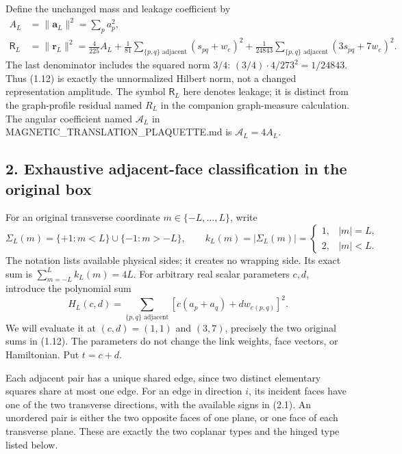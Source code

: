 \documentclass[
  11pt,
]{article}
\begin{document}
Define the unchanged mass and leakage coefficient by \[
\begin{split}
 A_L&=\|\mathbf a_L\|^2=\sum_pa_p^2,\\
 \mathsf R_L&=\|\mathbf r_L\|^2
 =\frac4{225}A_L
  +\frac1{81}\sum_{\{p,q\}\text{ adjacent}}(s_{pq}+w_e)^2
  +\frac1{24843}\sum_{\{p,q\}\text{ adjacent}}(3s_{pq}+7w_e)^2.
\end{split}
\tag{1.12}
\] The last denominator includes the squared norm \(3/4\):
\((3/4)\cdot4/273^2=1/24843\). Thus (1.12) is exactly the unnormalized
Hilbert norm, not a changed representation amplitude. The symbol
\(\mathsf R_L\) here denotes leakage; it is distinct from the
graph-profile residual named \(R_L\) in the companion graph-measure
calculation. The angular coefficient named \(\mathcal A_L\) in
MAGNETIC\_TRANSLATION\_PLAQUETTE.md is \(\mathcal A_L=4A_L\).

\subsection{2. Exhaustive adjacent-face classification in the original
box}\label{magnetic-part-11-exhaustive-adjacent-face-classification-in-the-original-box}

For an original transverse coordinate \(m\in\{-L,\ldots,L\}\), write \[
 \Sigma_L(m)=\{+1:m<L\}\cup\{-1:m>-L\},
 \qquad k_L(m)=|\Sigma_L(m)|
       =\begin{cases}1,&|m|=L,\\2,&|m|<L.\end{cases}
\tag{2.1}
\] The notation lists available physical sides; it creates no wrapping
side. Its exact sum is \(\sum_{m=-L}^Lk_L(m)=4L\). For arbitrary real
scalar parameters \(c,d\), introduce the polynomial sum \[
 H_L(c,d)=\sum_{\{p,q\}\text{ adjacent}}
                 [c(a_p+a_q)+d w_{e(p,q)}]^2.
\tag{2.2}
\] We will evaluate it at \((c,d)=(1,1)\) and \((3,7)\), precisely the
two original sums in (1.12). The parameters do not change the link
weights, face vectors, or Hamiltonian. Put \(t=c+d\).

Each adjacent pair has a unique shared edge, since two distinct
elementary squares share at most one edge. For an edge in direction
\(i\), its incident faces have one of the two transverse directions,
with the available signs in (2.1). An unordered pair is either the two
opposite faces of one plane, or one face of each transverse plane. These
are exactly the two coplanar types and the hinged type listed below.
\end{document}
